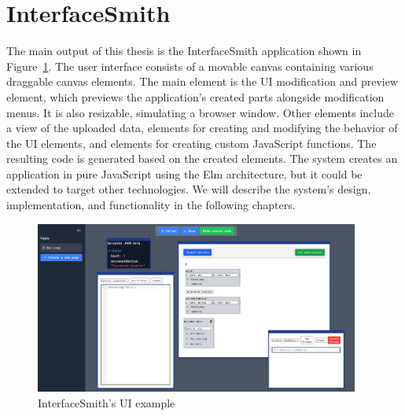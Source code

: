 \section*{InterfaceSmith}
\nopagebreak[4]
The main output of this thesis is the InterfaceSmith application shown in Figure~\ref{fig:prototype-teaser}.
The user interface consists of a movable canvas containing various draggable canvas elements.
The main element is the UI modification and preview element, which previews the application's created parts alongside modification menus. It is also resizable, simulating a browser window.
Other elements include a view of the uploaded data, elements for creating and modifying the behavior of the UI elements, and elements for creating custom JavaScript functions.
The resulting code is generated based on the created elements. The system creates an application in pure JavaScript using the Elm architecture\cite{elm-arch}, but it could be extended to target other technologies.
We will describe the system's design, implementation, and functionality in the following chapters.
\begin{figure}[htbp]
	\begin{center}
		\includegraphics[width=0.95\textwidth]{img/UIExample.pdf}
	\end{center}
	\caption{InterfaceSmith's UI example }
	\label{fig:prototype-teaser}
\end{figure}

\medskip
